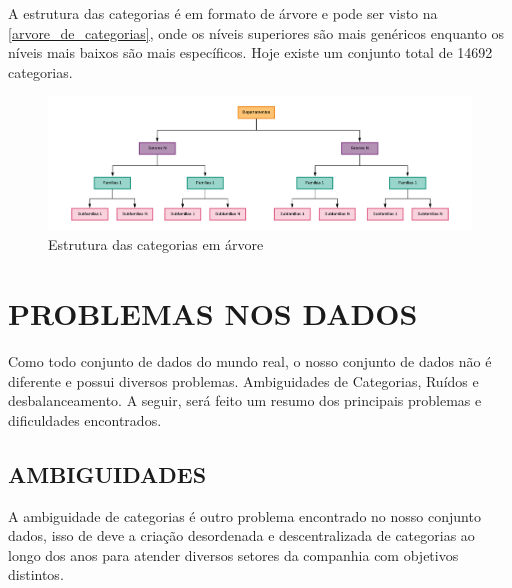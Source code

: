 A estrutura das categorias é em formato de árvore e pode ser visto na \autoref{arvore_de_categorias}, onde os níveis superiores são mais genéricos enquanto os níveis mais baixos são mais específicos. Hoje existe um conjunto total de 14692 categorias.

\begin{figure}[htb]
	\caption{\label{arvore_de_categorias} Estrutura das categorias em árvore}
	\begin{center}
	    \includegraphics[scale=0.5]{artigo/recursos/imagens/arvore-de-categorias.png}
	\end{center}
\end{figure}

\section{PROBLEMAS NOS DADOS}

Como todo conjunto de dados do mundo real, o nosso conjunto de dados não é diferente e possui diversos problemas. Ambiguidades de Categorias, Ruídos e desbalanceamento. A seguir, será feito um resumo dos principais problemas e dificuldades encontrados.

\subsection{AMBIGUIDADES}

A ambiguidade de categorias é outro problema encontrado no nosso conjunto dados, isso de deve a criação desordenada e descentralizada de categorias ao longo dos anos para atender diversos setores da companhia com objetivos distintos. 

